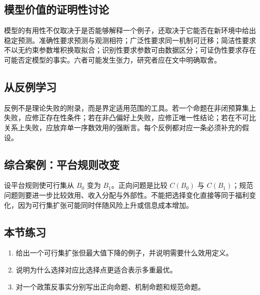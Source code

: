 \subsection{模型价值的证明性讨论}
模型的有用性不仅取决于是否能够解释一个例子，还取决于它能否在新环境中给出稳定预测。准确性要求预测与观测相符；广泛性要求同一机制可迁移；简洁性要求不以无约束参数堆积换取拟合；识别性要求参数可由数据区分；可证伪性要求存在可能否定模型的事实。六者可能发生张力，研究者应在文中明确取舍。

\subsection{从反例学习}
反例不是理论失败的附录，而是界定适用范围的工具。若一个命题在非闭预算集上失败，应修正存在性条件；若在非凸偏好上失败，应修正唯一性结论；若在不可比关系上失败，应放弃单一序数效用的强断言。每个反例都对应一条必须补充的假设。

\subsection{综合案例：平台规则改变}
设平台规则使可行集从 $B_0$ 变为 $B_1$。正向问题是比较 $C(B_0)$ 与 $C(B_1)$；规范问题则要进一步比较效用、收入分配与外部性。不能把选择变化直接等同于福利变化，因为可行集扩张可能同时伴随风险上升或信息成本增加。

\subsection{本节练习}
\begin{enumerate}
\item 给出一个可行集扩张但最大值下降的例子，并说明需要什么效用定义。
\item 说明为什么选择对应比选择点更适合表示多重最优。
\item 对一个政策反事实分别写出正向命题、机制命题和规范命题。
\end{enumerate}
